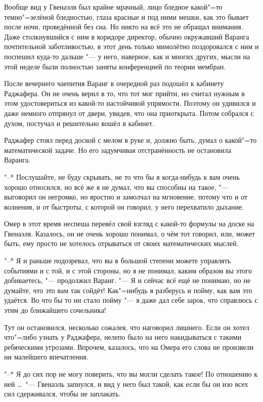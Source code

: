 Вообще вид у Гвенаэля был крайне мрачный, лицо бледное какой"=то темно"=зелёной
бледностью, глаза красные и под ними мешки, как это бывает после ночи,
проведённой без сна.
Но никто на всё это не обращал внимания.
Даже столкнувшийся с ним в коридоре директор, обычно окружавший Варанга
почтительной заботливостью, в этот день только мимолётно поздоровался с ним и
поспешил куда-то дальше "--- у него, наверное, как и многих других, мысли на
этой неделе были полностью заняты конференцией по теории мембран.

После вечернего чаепития Варанг в очередной раз подошёл к кабинету Раджафера.
Он не очень верил в то, что тот мог прийти, но считал нужным в этом
удостовериться из какой-то настойчивой упрямости.
Поэтому он удивился и даже немного отпрянул от двери, увидев, что она приоткрыта.
Потом собрался с духом, постучал и решительно вошёл в кабинет.

Раджафер стоял перед доской с мелом в руке и, должно быть, думал о какой"=то
математической задаче.
Но его задумчивая отстранённость не остановила Варанга.

"--* Послушайте, не буду скрывать, не то что бы я когда-нибудь к вам очень
хорошо относился, но всё же я не думал, что вы способны на такое, "--- выговорил
он негромко, но яростно и замолчал на мгновение, потому что и от волнения, и от
быстроты, с которой он говорил, у него перехватило дыхание.

Омер в этот время неспеша перевёл свой взгляд с какой-то формулы на доске на
Гвенаэля.
Казалось, он не очень хорошо понимал, о чём тот говорил, или, может быть, ему
просто не хотелось отрываться от своих математических мыслей.

"--* Я и раньше подозревал, что вы в большой степени можете управлять событиями
и с той, и с этой стороны, но я не понимал, каким образом вы этого добиваетесь,
"--- продолжил Варанг.
"--- Я и сейчас всё ещё не понимаю, но не думайте, что это вам так сойдёт!
Как"=нибудь я разберусь и пойму, как вам это удаётся.
Во что бы то ни стало пойму "--- я даже дал себе зарок, что справлюсь с этим до
ближайшего сочельника!

Тут он остановился, несколько сожалея, что наговорил лишнего.
Если он хотел что"=либо узнать у Раджафера, нелепо было на него накидываться с
такими ребяческими угрозами.
Впрочем, казалось, что на Омера его слова не произвели ни малейшего впечатления.

"--* Я до сих пор не могу поверить, что вы могли сделать такое!
По отношению к ней \ldots\ "--- Гвенаэль запнулся, и вид у него был такой, как
если бы он изо всех сил сдерживался, чтобы не заплакать.

